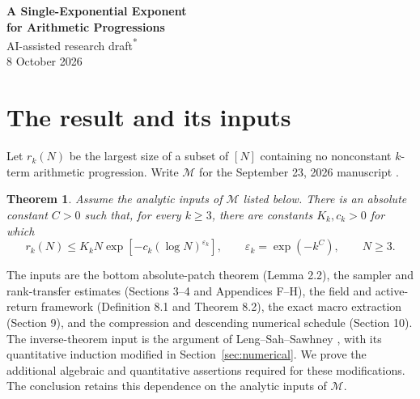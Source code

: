 \documentclass[11pt,a4paper]{article}
\newtheorem{theorem}{Theorem}[section]
\theoremstyle{definition}
\newcommand{\M}{\mathcal M}
\begin{document}
\begin{center}
{\Large\bfseries A Single-Exponential Exponent\\[3pt]
for Arithmetic Progressions}\\[7pt]
{\normalsize AI-assisted research draft\textsuperscript{*}}\\[5pt]
{\small 8 October 2026}
\end{center}
\begingroup
\renewcommand{\thefootnote}{\fnsymbol{footnote}}
\endgroup

\begin{abstract}
Using the analytic inputs of \emph{Quasipolynomial Bounds for Arithmetic
Progressions} (OpenAI/math, family 159), we obtain an admissible density
exponent \(\varepsilon_k=\exp(-k^C)\) for an absolute constant \(C\).
Two changes give the single-exponential dependence. An ordered return
factorization keeps historical substitutions out of the next active orbit,
so the geometric degree is \(O(k^2)\). An inverse-theorem induction retains
the supplied derivative witnesses, so its logarithmic-budget exponent is
single exponential in the order. The original rank bookkeeping and a
descending width recurrence then suffice. Only the single-exponential
dependence on \(k\) is tracked.
\end{abstract}

\section{The result and its inputs}

Let \(r_k(N)\) be the largest size of a subset of \([N]\) containing no
nonconstant \(k\)-term arithmetic progression. Write \(\M\) for the
September 23, 2026 manuscript \cite{openai}.

\begin{theorem}\label{thm:main}
Assume the analytic inputs of \(\M\) listed below. There is an absolute
constant \(C>0\) such that, for every \(k\ge3\), there are constants
\(K_k,c_k>0\) for which
\[
 r_k(N)\le K_kN\exp\!\left[-c_k(\log N)^{\varepsilon_k}\right],
 \qquad
 \varepsilon_k=\exp(-k^C),\qquad N\ge3.
\]
\end{theorem}

The inputs are the bottom absolute-patch theorem (Lemma 2.2), the
sampler and rank-transfer estimates (Sections 3--4 and Appendices F--H),
the field and active-return framework (Definition 8.1 and Theorem 8.2),
the exact macro extraction (Section 9), and the compression and
descending numerical schedule (Section 10). The inverse-theorem input is
the argument of Leng--Sah--Sawhney \cite{lss}, with its quantitative
induction modified in Section~\ref{sec:numerical}. We prove the additional
algebraic and quantitative assertions required for these modifications.
The conclusion retains this dependence on the analytic inputs of \(\M\).
\end{document}
